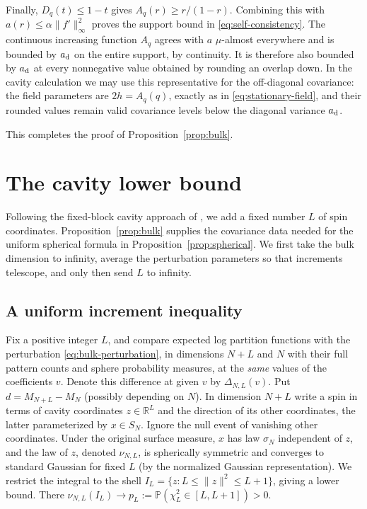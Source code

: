 \documentclass[11pt]{article}
\begin{document}
Finally, $D_q(t)\le1-t$ gives $A_q(r)\ge r/(1-r)$. Combining this
with $a(r)\le\alpha\|f'\|_\infty^2$ proves the support bound in
\eqref{eq:self-consistency}. The continuous increasing function $A_q$
agrees with $a$ $\mu$-almost everywhere and is bounded by $a_{\rm d}$
on the entire support, by continuity. It is therefore also bounded by
$a_{\rm d}$ at every nonnegative value obtained by rounding an overlap
down. In the cavity calculation we may use this representative for the
off-diagonal covariance: the field parameters are
$2h=A_q(q)$, exactly as in \eqref{eq:stationary-field}, and their rounded
values remain valid covariance levels below the diagonal variance
$a_{\rm d}$.

This completes the proof of Proposition~\ref{prop:bulk}.

\section{The cavity lower bound}\label{sec:cavity}

Following the fixed-block cavity approach of
\cite{AizenmanSimsStarr2003}, we add a fixed number $L$ of spin coordinates.
Proposition~\ref{prop:bulk} supplies the covariance data needed for the uniform
spherical formula in Proposition~\ref{prop:spherical}. We first take the bulk
dimension to infinity, average the perturbation parameters so that increments
telescope, and only then send $L$ to infinity.

\subsection{A uniform increment inequality}

Fix a positive integer $L$, and compare expected log partition functions with the perturbation \eqref{eq:bulk-perturbation}, in dimensions $N+L$ and $N$ with their full pattern counts and sphere probability measures, at the \emph{same} values of the coefficients $v$. Denote this difference at given $v$ by $\Delta_{N,L}(v)$. Put $d=M_{N+L}-M_N$ (possibly depending on $N$). In dimension $N+L$ write a spin in terms of cavity coordinates $z\in\mathbb R^L$ and the direction of its other coordinates, the latter parameterized by $x\in S_N$. Ignore the null event of vanishing other coordinates. Under the original surface measure, $x$ has law $\sigma_N$ independent of $z$, and the law of $z$, denoted $\nu_{N,L}$, is spherically symmetric and converges to standard Gaussian for fixed $L$ (by the normalized Gaussian representation). We restrict the integral to the shell $I_L=\{z:L\le\|z\|^2\le L+1\}$, giving a lower bound. There $\nu_{N,L}(I_L)\to p_L:=\mathbb P(\chi^2_L\in[L,L+1])>0$.
\end{document}

